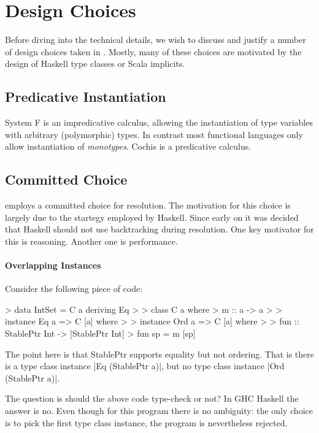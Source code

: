 \section{Design Choices}

Before diving into the technical details, we wish to discuss and justify a number of design 
choices taken in \name. Mostly, many of these choices are motivated by the design of Haskell 
type classes or Scala implicits.



\subsection{Predicative Instantiation}

System F is an impredicative calculus, allowing the instantiation of type variables with 
arbitrary (polymorphic) types. In contrast most functional languages only allow instantiation 
of \emph{monotypes}. Cochis is a predicative calculus. 

\subsection{Committed Choice}

\name employs a committed choice for resolution. The motivation for this choice is 
largely due to the startegy employed by Haskell. Since early on it was decided that Haskell 
should not use backtracking during resolution. One key motivator for this is reasoning. Another 
one is performance.

\paragraph{Overlapping Instances}

Consider the following piece of code:


> data IntSet = C a deriving Eq
> 
> class C a where
>   m :: a -> a
>
> instance Eq a => C [a] where
> 
> instance Ord a => C [a] where
> 
> fun :: StablePtr Int -> [StablePtr Int]
> fun sp = m [sp]

The point here is that StablePtr supports equality but not ordering. That is there 
is a type class instance |Eq (StablePtr a)|, but no type class instance |Ord (StablePtr a)|. 

The question is should the above code type-check or not? In GHC Haskell the answer is no. 
Even though for this program there is no ambiguity: the only choice is to pick the first 
type class instance, the program is nevertheless rejected. 


